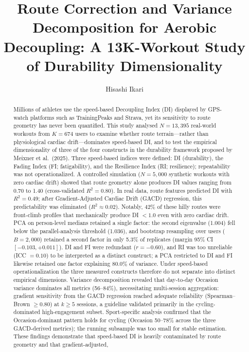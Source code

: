 \documentclass[times, twoside]{zHenriquesLab-StyleBioRxiv}
\begin{document}
\title{Route Correction and Variance Decomposition for Aerobic Decoupling: A 13K-Workout Study of Durability Dimensionality}

\author[1,\Letter]{Hisashi Ikari}


\maketitle


\begin{abstract}
Millions of athletes use the speed-based Decoupling Index (DI) displayed by GPS-watch platforms such as TrainingPeaks and Strava, yet its sensitivity to route geometry has never been quantified. This study analysed $N = 13{,}395$ real-world workouts from $K = 674$ users to examine whether route terrain---rather than physiological cardiac drift---dominates speed-based DI, and to test the empirical dimensionality of three of the four constructs in the durability framework proposed by Meixner et al.\ (2025). Three speed-based indices were defined: DI (durability), the Fading Index (FI; fatigability), and the Resilience Index (RI; resilience); repeatability was not operationalized. A controlled simulation ($N = 5{,}000$ synthetic workouts with zero cardiac drift) showed that route geometry alone produces DI values ranging from 0.70 to 1.40 (cross-validated $R^2 = 0.80$). In real data, route features predicted DI with $R^2 = 0.49$; after Gradient-Adjusted Cardiac Drift (GACD) regression, this predictability was eliminated ($R^2 \approx 0.02$). Notably, 42\% of these hilly routes were front-climb profiles that mechanically produce DI $< 1.0$ even with zero cardiac drift. PCA on person-level medians retained a single factor: the second eigenvalue (1.004) fell below the parallel-analysis threshold (1.036), and bootstrap resampling over users ($B = 2{,}000$) retained a second factor in only 5.3\% of replicates (margin 95\% CI $[-0.103, +0.011]$). DI and FI were redundant ($r = -0.60$), and RI was too unreliable (ICC $= 0.10$) to be interpreted as a distinct construct; a PCA restricted to DI and FI likewise retained one factor explaining 80.0\% of variance. Under speed-based operationalization the three measured constructs therefore do not separate into distinct empirical dimensions. Variance decomposition revealed that day-to-day Occasion variance dominates all metrics (56--84\%), necessitating multi-session aggregation: gradient sensitivity from the GACD regression reached adequate reliability (Spearman--Brown $\geq 0.80$) at $k \geq 5$ sessions, a guideline validated primarily in the cycling-dominated high-engagement subset. Sport-specific analysis confirmed that the Occasion-dominant pattern holds for cycling (Occasion 50--78\% across the three GACD-derived metrics); the running subsample was too small for stable estimation. These findings demonstrate that speed-based DI is heavily contaminated by route geometry and that gradient-adjusted, 
\end{abstract}
\end{document}
